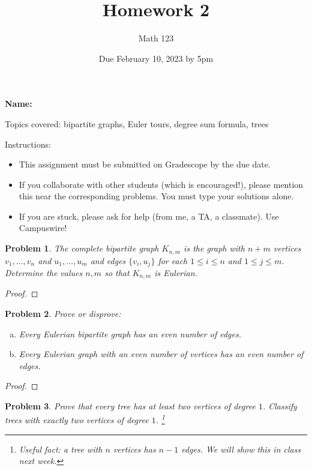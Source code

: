 \documentclass[11pt]{article}
\author{Math 123}
\date{Due February 10, 2023 by 5pm}
\title{Homework 2}
\newtheorem{problem}{Problem}
\begin{document}
\maketitle

{\bf\Large Name:} 


\vspace{.3in}
Topics covered: bipartite graphs, Euler tours, degree sum formula, trees

Instructions: 
\begin{itemize}
\item This assignment must be submitted on Gradescope by the due date. 
\item If you collaborate with other students (which is encouraged!), please mention this near the corresponding problems. You must type your solutions alone. 
\item If you are stuck, please ask for help (from me, a TA, a classmate). Use Campuswire!  
\end{itemize}
\pagebreak 



\begin{problem}
The complete bipartite graph $K_{n,m}$ is the graph with $n+m$ vertices $v_1,\ldots,v_n$ and $u_1,\ldots,u_m$ and edges $\{v_i,u_j\}$ for each $1\le i\le n$ and $1\le j\le m$. Determine the values $n,m$ so that $K_{n,m}$ is Eulerian.
\end{problem}

\begin{proof}

\end{proof} 

\begin{problem}
Prove or disprove: 
\begin{enumerate}[(a)]
\item Every Eulerian bipartite graph has an even number of edges. 
\item Every Eulerian graph with an even number of vertices has an even number of edges. 
\end{enumerate} 
\end{problem}

\begin{proof}


\end{proof}


\begin{problem}Prove that every tree has at least two vertices of degree $1$. Classify trees with exactly two vertices of degree $1$. \footnote{Useful fact: a tree with $n$ vertices has $n-1$ edges. We will show this in class next week.}
\end{problem}
\end{document}
